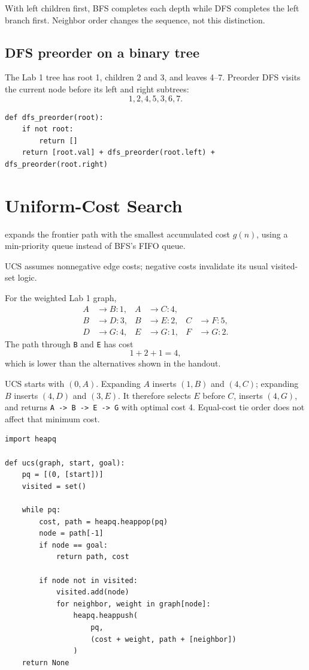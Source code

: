 With left children first, BFS completes each depth while DFS completes the left branch first. Neighbor order changes the sequence, not this distinction.

\subsection{DFS preorder on a binary tree}

The Lab 1 tree has root 1, children 2 and 3, and leaves 4--7. Preorder DFS visits the current node before its left and right subtrees:
\[
1,2,4,5,3,6,7.
\]

\begin{lstlisting}[style=mlpython]
def dfs_preorder(root):
    if not root:
        return []
    return [root.val] + dfs_preorder(root.left) + dfs_preorder(root.right)
\end{lstlisting}

\section{Uniform-Cost Search}

 expands the frontier path with the smallest accumulated cost \(g(n)\), using a min-priority queue instead of BFS's FIFO queue.

UCS assumes nonnegative edge costs; negative costs invalidate its usual visited-set logic.

For the weighted Lab 1 graph,
\begin{align*}
A&\to B:1, & A&\to C:4,\\
B&\to D:3, & B&\to E:2, & C&\to F:5,\\
D&\to G:4, & E&\to G:1, & F&\to G:2.
\end{align*}
The path through \texttt{B} and \texttt{E} has cost
\[
1+2+1=4,
\]
which is lower than the alternatives shown in the handout.

\begin{workedexample}
UCS starts with \((0,A)\). Expanding \(A\) inserts \((1,B)\) and \((4,C)\); expanding \(B\) inserts \((4,D)\) and \((3,E)\). It therefore selects \(E\) before \(C\), inserts \((4,G)\), and returns \texttt{A -> B -> E -> G} with optimal cost 4. Equal-cost tie order does not affect that minimum cost.
\end{workedexample}

\begin{lstlisting}[style=mlpython]
import heapq

def ucs(graph, start, goal):
    pq = [(0, [start])]
    visited = set()

    while pq:
        cost, path = heapq.heappop(pq)
        node = path[-1]
        if node == goal:
            return path, cost

        if node not in visited:
            visited.add(node)
            for neighbor, weight in graph[node]:
                heapq.heappush(
                    pq,
                    (cost + weight, path + [neighbor])
                )
    return None
\end{lstlisting}

